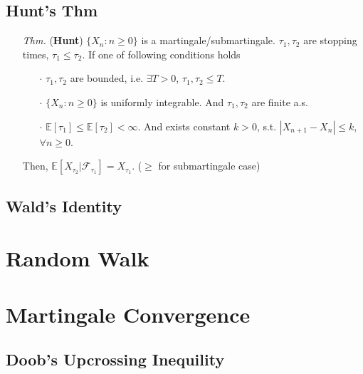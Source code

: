 \documentclass[a4paper,12pt,twoside]{book}
\begin{document}
\subsection{Hunt's Thm}
\begin{itemize}
	\item[\textit{Thm.}] (\textbf{Hunt}) $\{X_n: n\geq 0\}$ is a martingale/submartingale. $\tau_1, \tau_2$ are stopping times, $\tau_1 \leq \tau_2$. If one of following conditions holds
	\begin{itemize}
		\item[$\cdot$] $\tau_1, \tau_2$ are bounded, i.e. $\exists T>0$, $\tau_1, \tau_2 \leq T$. 
		\item[$\cdot$] $\{X_n: n\geq 0\}$ is uniformly integrable. And $\tau_1, \tau_2$ are finite a.s.
		\item[$\cdot$] $\mathbb{E}\left[\tau_1\right] \leq \mathbb{E}\left[\tau_2\right]<\infty$. And exists constant $k>0$, s.t. $|X_{n+1}-X_n|\leq k$, $\forall n \geq0$.
	\end{itemize}
	Then, $\mathbb{E}\left[X_{\tau_2}|\mathcal{F}_{\tau_1}\right]=X_{\tau_1}$. ($\geq$ for submartingale case)
\end{itemize}

\subsection{Wald's Identity}

\section{Random Walk}

\section{Martingale Convergence}

\subsection{Doob's Upcrossing Inequility}

\end{document}
